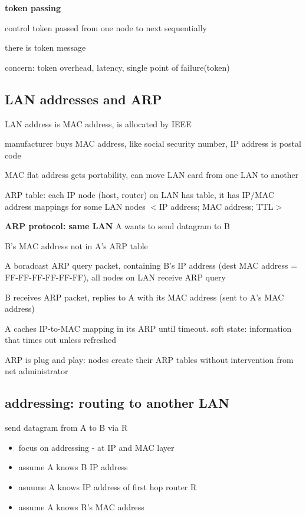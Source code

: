\documentclass[10pt]{article}
\theoremstyle{break}
\begin{document}
\textbf{token passing}

control token passed from one node to next sequentially 

there is token message 

concern: token overhead, latency, single point of failure(token)

\subsection{LAN addresses and ARP}
LAN address is MAC address, is allocated by IEEE 

manufacturer buys MAC address, like social security number, IP address is postal code 

MAC flat address gets portability, can move LAN card from one LAN to another 

ARP table: each IP node (host, router) on LAN has table,
it has IP$/$MAC address mappings for some LAN nodes $<$IP address; MAC address; TTL$>$


\textbf{ARP protocol: same LAN}
A wants to send datagram to B 

B's MAC address not in A's ARP table 

A boradcast ARP query packet, containing B's IP address 
(dest MAC address = FF-FF-FF-FF-FF-FF), all nodes on LAN receive ARP query

B receives ARP packet, replies to A with its MAC address 
(sent to A's MAC address)

A caches IP-to-MAC mapping in its ARP until timeout.
soft state: information that times out unless refreshed 

ARP is plug and play: nodes create their ARP tables without intervention from net administrator

\subsection{addressing: routing to another LAN}
send datagram from A to B via R 

\begin{itemize}
    \item focus on addressing - at IP and MAC layer 
    \item assume A knows B IP address 
    \item asuume A knows IP address of first hop router R
    \item assume A knows R's MAC address
\end{itemize}
\end{document}
